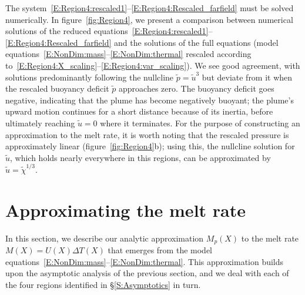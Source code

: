 \documentclass{jfm}
\renewcommand{\p}{p} %
\begin{document}
The system~\eqref{E:Region4:rescaled1}--\eqref{E:Region4:Rescaled_farfield} must be solved numerically. In figure~\ref{fig:Region4}, we present a comparison between numerical solutions of the reduced equations~\eqref{E:Region4:rescaled1}--\eqref{E:Region4:Rescaled_farfield} and the solutions of the full equations (model equations~\eqref{E:NonDim:mass}--\eqref{E:NonDim:thermal} rescaled according to~\eqref{E:Region4:X_scaling}--\eqref{E:Region4:var_scaling}). We see good agreement, with solutions predominantly following the nullcline $\tilde{\p} = \tilde{u}^3$ but deviate from it when the rescaled buoyancy deficit $\tilde{\p}$ approaches zero. The buoyancy deficit goes negative, indicating that the plume has become negatively buoyant; the plume's upward motion continues for a short distance because of its inertia, before ultimately reaching $\tilde{u} = 0$ where it terminates. For the purpose of constructing an approximation to the melt rate, it is worth noting that the rescaled pressure is approximately linear (figure~\ref{fig:Region4}b); using this, the nullcline solution for $\tilde{u}$, which holds nearly everywhere in this regions, can be approximated by $\tilde{u} = \tilde{\chi}^{1/3}$.




\section{Approximating the melt rate}\label{S:MeltRate}
In this section, we describe our analytic approximation $M_p(X)$ to the melt rate $M(X) = U(X)\Delta T(X)$ that emerges from the model equations~\eqref{E:NonDim:mass}--\eqref{E:NonDim:thermal}. This approximation builds upon the asymptotic analysis of the previous section, and we deal with each of the four regions identified in \S\ref{S:Asymptotics} in turn.
\end{document}
